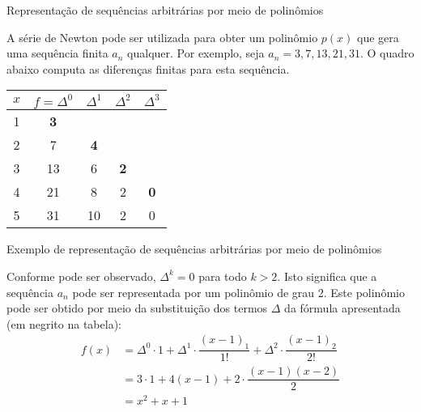 \begin{frame}[fragile]{Representação de sequências arbitrárias por meio de polinômios}

A série de Newton pode ser utilizada para obter um polinômio $p(x)$ que gera uma sequência finita $a_n$ qualquer. Por exemplo, seja $a_n = 3, 7, 13, 21, 31$. O quadro abaixo computa as diferenças finitas para esta sequência.

\begin{table}[h]
    \centering

    \begin{tabular}{ccccc}
    \toprule
        $x$ & $f = \Delta^0$ & $\Delta^1$ & $\Delta^2$ & $\Delta^3$ \\
    \midrule
         1 & \textbf{3} \\
         2 & 7 & \textbf{4}\\
         3 & 13 & 6 & \textbf{2} \\
         4 & 21 & 8 & 2 & \textbf{0}\\
         5 & 31 & 10 & 2 & 0 \\
    \bottomrule
    \end{tabular}
\end{table}

\end{frame}

\begin{frame}[fragile]{Exemplo de representação de sequências arbitrárias por meio de polinômios}

Conforme pode ser observado, $\Delta^k = 0$ para todo $k > 2$. Isto significa que a sequência $a_n$ pode ser representada por um polinômio de grau 2. Este polinômio pode ser obtido por meio da substituição dos termos $\Delta$ da fórmula apresentada (em negrito na tabela):
\begin{align*}
    f(x) &= \Delta^0 \cdot 1 + \Delta^1 \cdot \dfrac{(x - 1)_1}{1!} + \Delta^2\cdot \dfrac{(x - 1)_2}{2!} \\
    &= 3\cdot 1 + 4(x - 1) + 2\cdot \dfrac{(x - 1)(x - 2)}{2} \\
    &= x^2 + x  + 1 \\
\end{align*}

\end{frame}
